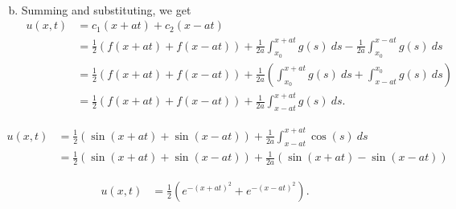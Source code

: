 \documentclass[10pt]{mypackage}
\begin{document}
\begin{solution}[12.4, Problem 14]
\begin{enumerate}[(a)]
\begin{align*}
      \end{align*}
    \item Summing and substituting, we get
      \begin{align*}
        u\left( x,t \right) &= c_1(x+at) + c_2(x-at)\\
                            &= \frac{1}{2}\left( f(x+at) + f(x-at) \right) + \frac{1}{2a} \int_{x_0}^{x+at} g(s)\:ds - \frac{1}{2a} \int_{x_0}^{x-at} g(s)\:ds\\
                            &= \frac{1}{2} \left( f(x+at) + f(x-at) \right) + \frac{1}{2a} \left( \int_{x_0}^{x+at} g(s)\:ds + \int_{x-at}^{x_0} g(s)\:ds \right)\\
                            &= \frac{1}{2} \left( f(x+at) + f(x-at) \right) + \frac{1}{2a} \int_{x-at}^{x+at} g(s)\:ds.
      \end{align*}
  \end{enumerate}
\end{solution}
\begin{solution}[12.4, Problem 16]
      \begin{align*}
        u\left( x,t \right) &= \frac{1}{2}\left( \sin\left( x+at \right) + \sin\left( x-at \right) \right) + \frac{1}{2a} \int_{x-at}^{x+at} \cos(s)\:ds\\
                            &= \frac{1}{2}\left( \sin\left( x+at \right) + \sin\left( x-at \right) \right) + \frac{1}{2a}\left( \sin\left( x+at \right) - \sin\left( x-at \right) \right) 
      \end{align*}
\end{solution}
\begin{solution}[12.4, Problem 18]
  \begin{align*}
    u\left( x,t \right) &= \frac{1}{2}\left( e^{-\left( x+at \right)^2} + e^{-\left( x-at \right)^2} \right).
  \end{align*}
\end{solution}
\end{document}

